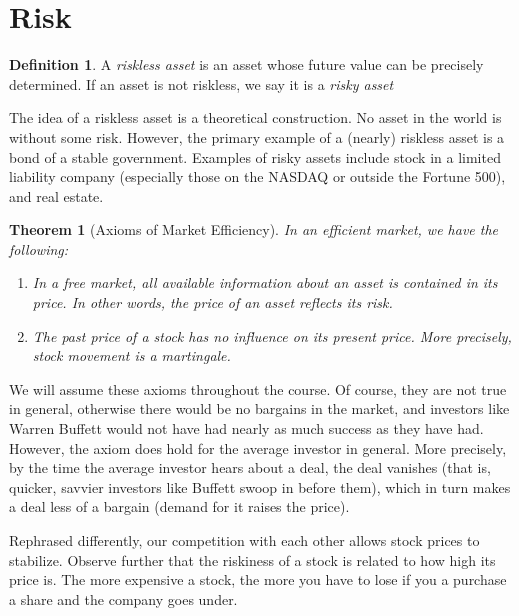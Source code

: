 \documentclass[12pt]{article}
\theoremstyle{plain}
\newtheorem{theorem}{Theorem}
\theoremstyle{definition}
\newtheorem*{definition}{Definition}
\theoremstyle{remark}
\numberwithin{equation}{section}  %
\begin{document}
\section{Risk}
\begin{definition}
	A \emph{riskless asset} is an asset whose future value can be precisely 
	determined. If an asset is not riskless, we say it is a \emph{risky asset} 
\end{definition}
The idea of a riskless asset is a theoretical construction. No asset in the 
world is without some risk. However, the primary example of a (nearly) riskless 
asset is a bond of a stable government. Examples of risky assets include stock 
in a limited liability company (especially those on the NASDAQ or outside the 
Fortune 500),
and real estate.

\begin{theorem}[Axioms of Market Efficiency]
	In an efficient market, we have the following: 
	\begin{enumerate}
		\item 
			In a free market, all available information about an asset is 
			contained in its price. In other words, the price of an asset 
			reflects its risk.
		\item 
			The past price of a stock has no influence on its present price. 
			More precisely,
			stock movement is a martingale.
	\end{enumerate}
\end{theorem}
We will assume these axioms throughout the course. Of course, they are not true 
in general, otherwise there would be no bargains in the market, and investors 
like Warren Buffett would not have had nearly as much success as they have had. 
However, the axiom does hold for the average investor in general. More 
precisely, by the time the average investor hears about a deal, the deal 
vanishes (that is, quicker, savvier investors like Buffett swoop in before 
them), which in turn makes a deal less of a bargain (demand for it raises the 
price). 

Rephrased differently, our competition with each other allows stock prices to 
stabilize. Observe further that the riskiness of a stock is related to how high 
its price is.
The more expensive a stock, the more you have to lose if you a purchase a share 
and the company goes under. 
\end{document}

